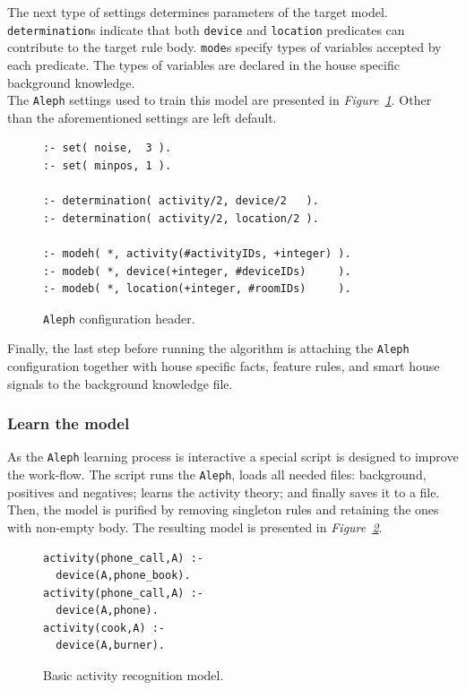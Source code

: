 \documentclass[10pt, a4paper, pdflatex, leqno, twoside, openright]{report}
\begin{document}
The next type of settings determines parameters of the target model. \texttt{determination}s indicate that both \texttt{device} and \texttt{location} predicates can contribute to the target rule body. \texttt{mode}s specify types of variables accepted by each predicate. The types of variables are declared in the house specific background knowledge.\\

The \texttt{Aleph} settings used to train this model are presented in \emph{Figure~\ref{lst:alephConfHead}}. Other than the aforementioned settings are left default.\\

\begin{figure}[htb]
  \begin{verbatim}
:- set( noise,  3 ).
:- set( minpos, 1 ).

:- determination( activity/2, device/2   ).
:- determination( activity/2, location/2 ).

:- modeh( *, activity(#activityIDs, +integer) ).
:- modeb( *, device(+integer, #deviceIDs)     ).
:- modeb( *, location(+integer, #roomIDs)     ).
  \end{verbatim}
  \caption{\texttt{Aleph} configuration header.\label{lst:alephConfHead}}
\end{figure}

Finally, the last step before running the algorithm is attaching the \texttt{Aleph} configuration together with house specific facts, feature rules, and smart house signals to the background knowledge file.

      \subsubsection{Learn the model}
As the \texttt{Aleph} learning process is interactive a special script is designed to improve the work-flow. The script runs the \texttt{Aleph}, loads all needed files: background, positives and negatives; learns the activity theory; and finally saves it to a file.\\
Then, the model is purified by removing singleton rules and retaining the ones with non-empty body. The resulting model is presented in \emph{Figure~\ref{lst:alephBasicModel}}.\\

\begin{figure}[htb]
  \begin{verbatim}
activity(phone_call,A) :-
  device(A,phone_book).
activity(phone_call,A) :-
  device(A,phone).
activity(cook,A) :-
  device(A,burner).
  \end{verbatim}
  \caption{Basic activity recognition model.\label{lst:alephBasicModel}}
\end{figure}
\end{document}
